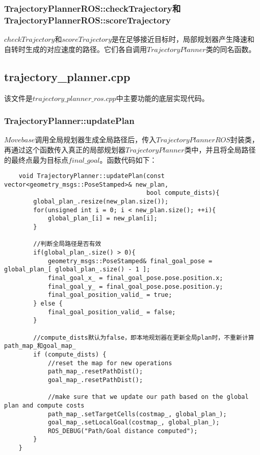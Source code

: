 \documentclass[9pt, oneside]{book}
\begin{document}
\subsubsection{TrajectoryPlannerROS::checkTrajectory和TrajectoryPlannerROS::scoreTrajectory}

$checkTrajectory$和$scoreTrajectory$是在足够接近目标时，局部规划器产生降速和自转时生成的对应速度的路径。它们各自调用$TrajectoryPlanner$类的同名函数。

\subsection{trajectory\_planner.cpp}

该文件是$trajectory\_planner\_ros.cpp$中主要功能的底层实现代码。

\subsubsection{TrajectoryPlanner::updatePlan}

$Movebase$调用全局规划器生成全局路径后，传入$TrajectoryPlannerROS$封装类，再通过这个函数传入真正的局部规划器$TrajectoryPlanner$类中，并且将全局路径的最终点最为目标点$final\_goal$。函数代码如下：

\footnotesize
\begin{verbatim}
    void TrajectoryPlanner::updatePlan(const vector<geometry_msgs::PoseStamped>& new_plan, 
                                       bool compute_dists){
        global_plan_.resize(new_plan.size());
        for(unsigned int i = 0; i < new_plan.size(); ++i){
            global_plan_[i] = new_plan[i];
        }
    
        //判断全局路径是否有效
        if(global_plan_.size() > 0){
            geometry_msgs::PoseStamped& final_goal_pose = global_plan_[ global_plan_.size() - 1 ];
            final_goal_x_ = final_goal_pose.pose.position.x;
            final_goal_y_ = final_goal_pose.pose.position.y;
            final_goal_position_valid_ = true;
        } else {
            final_goal_position_valid_ = false;
        }
    
        //compute_dists默认为false，即本地规划器在更新全局plan时，不重新计算path_map_和goal_map_
        if (compute_dists) {
            //reset the map for new operations
            path_map_.resetPathDist();
            goal_map_.resetPathDist();
        
            //make sure that we update our path based on the global plan and compute costs
            path_map_.setTargetCells(costmap_, global_plan_);
            goal_map_.setLocalGoal(costmap_, global_plan_);
            ROS_DEBUG("Path/Goal distance computed");
        }
    }
\end{verbatim}
\end{document}
